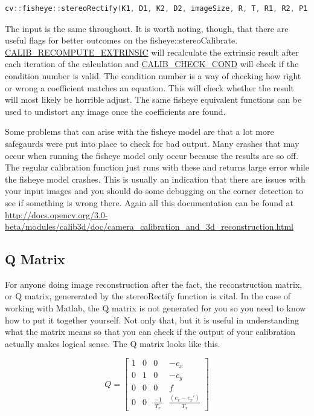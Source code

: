 \documentclass{article}
\begin{document}
\begin{lstlisting}[language=C++, frame=single, breaklines]
cv::fisheye::stereoRectify(K1, D1, K2, D2, imageSize, R, T, R1, R2, P1, P2, Q, cv::CALIB_ZERO_DISPARITY, imageSize, 0.0, 1.0);
\end{lstlisting}

The input is the same throughout. It is worth noting, though, that there are useful flags for better outcomes on the fisheye::stereoCalibrate. \url{CALIB_RECOMPUTE_EXTRINSIC} will recalculate the extrinsic result after each iteration of the calculation and \url{CALIB_CHECK_COND} will check if the condition number is valid. The condition number is a way of checking how right or wrong a coefficient matches an equation. This will check whether the result will most likely be horrible adjust. The same fisheye equivalent functions can be used to undistort any image once the coefficients are found. 

Some problems that can arise with the fisheye model are that a lot more safegaurds were put into place to check for bad output. Many crashes that may occur when running the fisheye model only occur because the results are so off. The regular calibration function just runs with these and returns large error while the fisheye model crashes. This is usually an indication that there are issues with your input images and you should do some debugging on the corner detection to see if something is wrong there. Again all this documentation can be found at \url{http://docs.opencv.org/3.0-beta/modules/calib3d/doc/camera_calibration_and_3d_reconstruction.html}

\subsection{Q Matrix}

For anyone doing image reconstruction after the fact, the reconstruction matrix, or Q matrix, genererated by the stereoRectify function is vital. In the case of working with Matlab, the Q matrix is not generated for you so you need to know how to put it together yourself. Not only that, but it is useful in understanding what the matrix means so that you can check if the output of your calibration actually makes logical sense. The Q matrix looks like this. 

\[ Q = 
\begin{bmatrix}
1 & 0 & 0 & -c_x \\ 0 & 1 & 0 & -c_y \\ 0 & 0 & 0 & f \\ 0 & 0 & \frac{-1}{T_x} & \frac{(c_x-c_x')}{T_x}
\end{bmatrix}
\]
\end{document}
